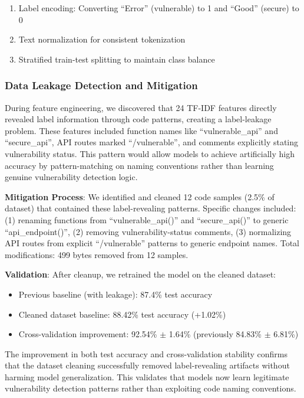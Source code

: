\documentclass[conference]{IEEEtran}
\begin{document}
\begin{enumerate}
    \item Label encoding: Converting ``Error'' (vulnerable) to 1 and ``Good'' (secure) to 0
    \item Text normalization for consistent tokenization
    \item Stratified train-test splitting to maintain class balance
\end{enumerate}

\subsubsection{Data Leakage Detection and Mitigation}

During feature engineering, we discovered that 24 TF-IDF features directly revealed label information through code patterns, creating a label-leakage problem. These features included function names like ``vulnerable\_api'' and ``secure\_api'', API routes marked ``/vulnerable'', and comments explicitly stating vulnerability status. This pattern would allow models to achieve artificially high accuracy by pattern-matching on naming conventions rather than learning genuine vulnerability detection logic.

\textbf{Mitigation Process}: We identified and cleaned 12 code samples (2.5\% of dataset) that contained these label-revealing patterns. Specific changes included: (1) renaming functions from ``vulnerable\_api()'' and ``secure\_api()'' to generic ``api\_endpoint()'', (2) removing vulnerability-status comments, (3) normalizing API routes from explicit ``/vulnerable'' patterns to generic endpoint names. Total modifications: 499 bytes removed from 12 samples.

\textbf{Validation}: After cleanup, we retrained the model on the cleaned dataset:
\begin{itemize}
    \item Previous baseline (with leakage): 87.4\% test accuracy
    \item Cleaned dataset baseline: 88.42\% test accuracy (+1.02\%)
    \item Cross-validation improvement: 92.54\% $\pm$ 1.64\% (previously 84.83\% $\pm$ 6.81\%)
\end{itemize}

The improvement in both test accuracy and cross-validation stability confirms that the dataset cleaning successfully removed label-revealing artifacts without harming model generalization. This validates that models now learn legitimate vulnerability detection patterns rather than exploiting code naming conventions.
\end{document}
